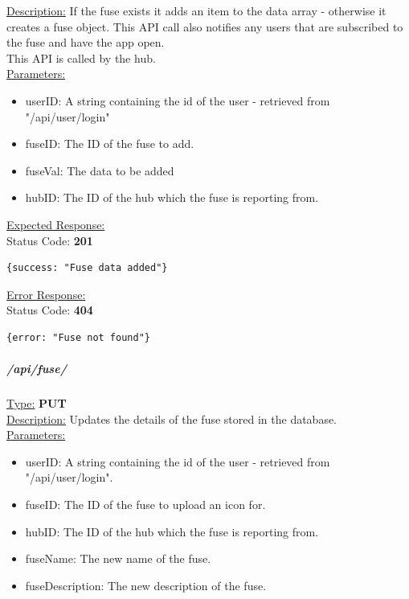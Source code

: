 \documentclass[preprint,12pt,3p]{elsarticle}
\newcommand{\forceindent}{\leavevmode{\parindent=1em\indent}}
\begin{document}
\underline{Description:} If the fuse exists it adds an item to the data array - otherwise it creates a fuse object. This API call also notifies any users that are subscribed to the fuse and have the app open.\\
This API is called by the hub.\\

\underline{Parameters:}
\begin{itemize}
\item userID: A string containing the id of the user - retrieved from "/api/user/login"

\item fuseID: The ID of the fuse to add.

\item fuseVal: The data to be added

\item hubID: The ID of the hub which the fuse is reporting from.

\end{itemize}

\underline{Expected Response:}\\[5pt]
\forceindent Status Code: \textbf{201} \\
\begin{verbatim}
{success: "Fuse data added"}
\end{verbatim}
\underline{Error Response:}\\[5pt]
\forceindent Status Code: \textbf{404} \\
\begin{verbatim}
{error: "Fuse not found"}
\end{verbatim}

\subparagraph*{/api/fuse/}
\underline{Type:} \textbf{PUT}\\

\underline{Description:} Updates the details of the fuse stored in the database.\\

\underline{Parameters:}
\begin{itemize}
\item userID: A string containing the id of the user - retrieved from "/api/user/login".

\item fuseID: The ID of the fuse to upload an icon for.

\item hubID: The ID of the hub which the fuse is reporting from.

\item fuseName: The new name of the fuse.

\item fuseDescription: The new description of the fuse.
\end{itemize}
\end{document}
